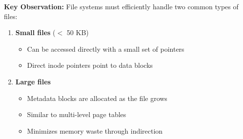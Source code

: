 \noindent
\begin{minipage}{0.55\textwidth}
  \textbf{Key Observation:} File systems must efficiently handle two common types of files:
  
  \begin{enumerate}
    \item \textbf{Small files} ($<$ 50 KB)
      \begin{itemize}
        \item Can be accessed directly with a small set of pointers
        \item Direct inode pointers point to data blocks
      \end{itemize}
    
    \item \textbf{Large files}
      \begin{itemize}
        \item Metadata blocks are allocated as the file grows
        \item Similar to multi-level page tables
        \item Minimizes memory waste through indirection
      \end{itemize}
  \end{enumerate}
\end{minipage}
\hfill
\vline
\hfill
